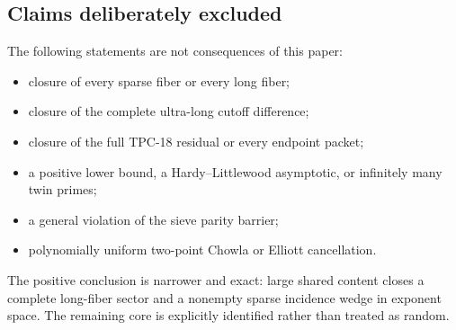 \subsection{Claims deliberately excluded}

The following statements are not consequences of this paper:
\begin{itemize}
 \item closure of every sparse fiber or every long fiber;
 \item closure of the complete ultra-long cutoff difference;
 \item closure of the full TPC-18 residual or every endpoint packet;
 \item a positive lower bound, a Hardy--Littlewood asymptotic, or
 infinitely many twin primes;
 \item a general violation of the sieve parity barrier;
 \item polynomially uniform two-point Chowla or Elliott cancellation.
\end{itemize}

The positive conclusion is narrower and exact: large shared content
closes a complete long-fiber sector and a nonempty sparse incidence
wedge in exponent space.  The remaining core is explicitly identified
rather than treated as random.
